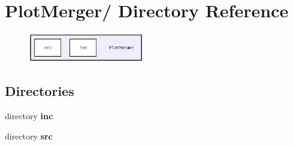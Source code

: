 \section{Plot\-Merger/ Directory Reference}
\label{dir_29aa4c1d8b398d119c7fa32db0f129c4}


\begin{figure}[H]
\begin{center}
\leavevmode
\includegraphics[width=143pt]{dir_29aa4c1d8b398d119c7fa32db0f129c4_dep}
\end{center}
\end{figure}
\subsection*{Directories}
\begin{CompactItemize}
\item 
directory \bf{inc}
\item 
directory \bf{src}
\end{CompactItemize}

